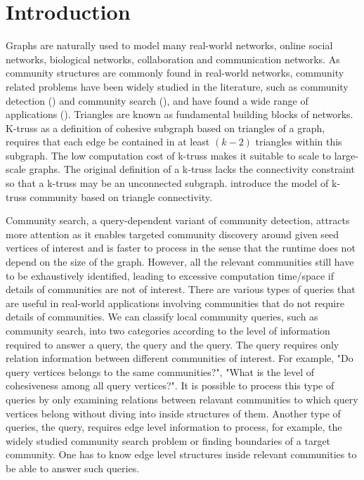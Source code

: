 \section{Introduction}
\label{introduction}

Graphs are naturally used to model many real-world networks, \eg online social networks, biological networks, collaboration and communication networks. As community structures are commonly found in real-world networks, community related problems have been widely studied in the literature, such as community detection (\cite{newman2004finding, xie2013overlapping}) and community search (\cite{huang2014querying, akbas2017truss, huang2015approximate, lee2016query, sozio2010community, cui2014local, li2015influential, barbieri2015efficient}), and have found a wide range of applications (\cite{durmaz2017frequent,zong2015behavior,yin2017taming}). Triangles are known as fundamental building blocks of networks. K-truss as a definition of cohesive subgraph based on triangles of a graph, requires that each edge be contained in at least $(k - 2)$ triangles within this subgraph. The low computation cost of k-truss makes it suitable to scale to large-scale graphs.
The original definition of a k-truss lacks the connectivity constraint so that a k-truss may be an unconnected subgraph. \cite{huang2014querying} introduce the model of k-truss community based on triangle connectivity.

Community search, a query-dependent variant of community detection, attracts more attention as it enables targeted community discovery around given seed vertices of interest and is faster to process in the sense that the runtime does not depend on the size of the graph. However, all the relevant communities still have to be exhaustively identified, leading to excessive computation time/space if details of communities are not of interest. There are various types of queries that are useful in real-world applications involving communities that do not require details of communities. 
We can classify local community queries, such as community search, into two categories according to the level of information required to answer a query, the \toplevelprob{} query and the \bottomlevelprob{} query. The \toplevelprob{} query requires only relation information between different communities of interest. For example, "Do query vertices belongs to the same communities?", "What is the level of cohesiveness among all query vertices?". It is possible to process this type of queries by only examining relations between relavant communities to which query vertices belong without diving into inside structures of them. Another type of queries, the \bottomlevelprob{} query, requires edge level information to process, for example, the widely studied community search problem or finding boundaries of a target community. One has to know edge level structures inside relevant communities to be able to answer such queries.

